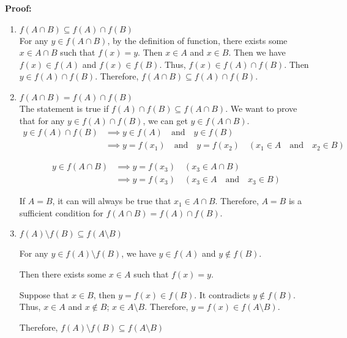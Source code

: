 \documentclass[12pt]{article}
\newcommand{\fasb}{
f(A) \cap f(B)
}
\newcommand{\fab}{
f(A \cap B)
}
\newcommand{\fxab}{
    f(A) \setminus f(B)
}
\newcommand{\faxb}{
    f(A \setminus B)
}
\newcommand{\fxstTwo}{
\fxab \subseteq \faxb
}
\begin{document}
\textbf{Proof:}
\renewcommand{\labelenumi}{\alph{enumi})}
\renewcommand{\labelenumii}{\arabic{enumii})}
\begin{enumerate}
    \item \(f(A \cap B) \subseteq f(A) \cap f(B)\)\\
    For any \(y \in f(A \cap B)\), by the definition of function, there exists some \(x \in A \cap B\) such that \(f(x) = y \).
    Then \(x \in A\) and \(x \in B\). Then we have \(f(x) \in f(A)\) and \(f(x) \in f(B)\). Thus, \(f(x) \in f(A) \cap f(B)\).
    Then \(y \in f(A) \cap f(B)\). Therefore, \(f(A \cap B) \subseteq f(A) \cap f(B)\).
    \item \(\fab = \fasb \)\\
    The statement is true if \(\fasb \subseteq \fab\). We want to prove that for any \(y \in \fasb\),
    we can get \(y \in \fab\).
    \begin{equation}
        \begin{aligned}
        y \in \fasb & \implies y \in f(A) \quad \text{and} \quad y \in f(B)\\
        & \implies y = f(x_1) \quad \text{and} \quad y = f(x_2) \quad
        (x_1 \in A \quad \text{and} \quad  x_2 \in B)
        \end{aligned}
    \end{equation}

    \begin{equation}
        \begin{aligned}
        y \in \fab & \implies y = f(x_3) \quad (x_3 \in A \cap B)\\
        & \implies y = f(x_3) \quad (x_3 \in A \quad \text{and} \quad x_3 \in B)
        \end{aligned}
    \end{equation}

    If \(A = B\), it can will always be true that \(x_1 \in A \cap B\). Therefore, \(A = B\) is a sufficient condition for \(\fab = \fasb\).

    \item \(\fxstTwo\)

    For any \(y \in \fxab\), we have \(y \in f(A)\) and \(y \notin f(B)\).

    Then there exists some \(x \in A\) such that \(f(x)=y\).

    Suppose that \(x \in B\), then \(y = f(x) \in f(B)\). It contradicts \(y \notin f(B)\).
    Thus, \(x \in A\) and \(x \notin B\); \(x \in A \setminus B\). Therefore, \(y = f(x) \in \faxb\).

    Therefore, \(\fxstTwo\)


\end{enumerate}
\end{document}
